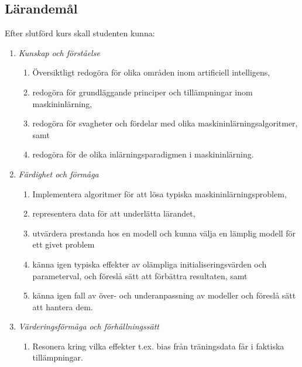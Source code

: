 \subsection*{Lärandemål}

Efter slutförd kurs skall studenten kunna:

\begin{enumerate}
\def\labelenumi{\Alph{enumi}.}
\tightlist
\item
  \emph{Kunskap och förståelse}

  \begin{enumerate}
  \def\labelenumii{\Alph{enumi}.\arabic{enumii}.}
  \tightlist
  \item
    Översiktligt redogöra för olika områden inom artificiell
    intelligens,\\
  \item
    redogöra för grundläggande principer och tillämpningar inom
    maskininlärning,
  \item
    redogöra för svagheter och fördelar med olika
    maskininlärningsalgoritmer, samt
  \item
    redogöra för de olika inlärningsparadigmen i maskininlärning.
  \end{enumerate}
\item
  \emph{Färdighet och förmåga}

  \begin{enumerate}
  \def\labelenumii{\Alph{enumi}.\arabic{enumii}.}
  \tightlist
  \item
    Implementera algoritmer för att lösa typiska
    maskininlärningsproblem,
  \item
    representera data för att underlätta lärandet,
  \item
    utvärdera prestanda hos en modell och kunna välja en lämplig modell
    för ett givet problem
  \item
    känna igen typiska effekter av olämpliga initialiseringsvärden och
    parameterval, och föreslå sätt att förbättra resultaten, samt
  \item
    känna igen fall av över- och underanpassning av modeller och föreslå
    sätt att hantera dem.
  \end{enumerate}
\item
  \emph{Värderingsförmåga och förhållningssätt}

  \begin{enumerate}
  \def\labelenumii{\Alph{enumi}.\arabic{enumii}.}
  \tightlist
  \item
    Resonera kring vilka effekter t.ex. bias från träningsdata får i
    faktiska tillämpningar.
  \end{enumerate}
\end{enumerate}

